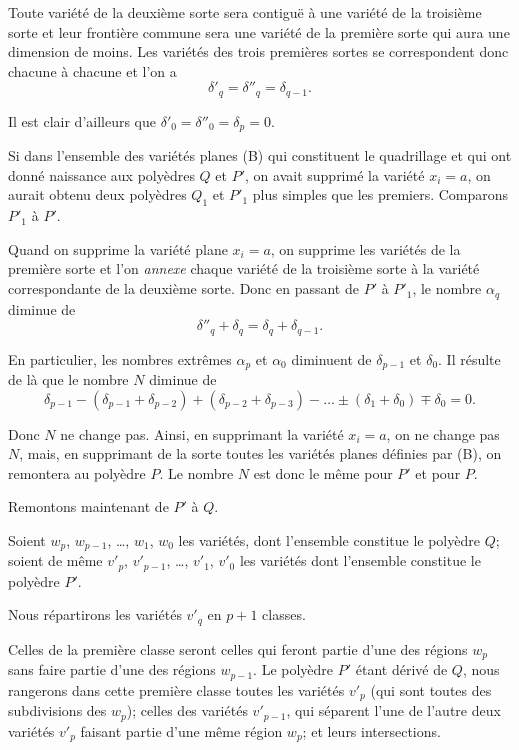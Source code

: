 \documentclass{article}
\begin{document}
Toute variété de la deuxième sorte sera contiguë à une variété de la troisième sorte et leur frontière commune sera une variété de la première sorte qui aura une dimension de moins. Les variétés des trois premières sortes se correspondent donc chacune à chacune et l'on a
\[ \delta'_{q} = \delta''_{q} = \delta_{q-1}. \]

Il est clair d'ailleurs que $\delta'_{0} = \delta''_{0} = \delta_{p} = 0$.

Si dans l'ensemble des variétés planes (B) qui constituent le quadrillage et qui ont donné naissance aux polyèdres $Q$ et $P'$, on avait supprimé la variété $x_{i} = a$, on aurait obtenu deux polyèdres $Q_{1}$ et $P'_{1}$ plus simples que les premiers. Comparons $P'_{1}$ à $P'$.

Quand on supprime la variété plane $x_{i} = a$, on supprime les variétés de la première sorte et l'on \emph{annexe} chaque variété de la troisième sorte à la variété correspondante de la deuxième sorte. Donc en passant de $P'$ à $P'_{1}$, le nombre $\alpha_{q}$ diminue de
\[ \delta''_{q} + \delta_{q} = \delta_{q} + \delta_{q-1}. \]

En particulier, les nombres extrêmes $\alpha_{p}$ et $\alpha_{0}$ diminuent de $\delta_{p-1}$ et $\delta_{0}$. Il résulte de là que le nombre $N$ diminue de
\[ \delta_{p-1} - (\delta_{p-1} + \delta_{p-2}) + (\delta_{p-2} + \delta_{p-3}) - \ldots \pm (\delta_{1} + \delta_{0}) \mp \delta_{0} = 0. \]

Donc $N$ ne change pas. Ainsi, en supprimant la variété $x_{i} = a$, on ne change pas $N$, mais, en supprimant de la sorte toutes les variétés planes définies par (B), on remontera au polyèdre $P$. Le nombre $N$ est donc le même pour $P'$ et pour $P$.

Remontons maintenant de $P'$ à $Q$.

Soient $w_{p}$, $w_{p-1}$, \ldots, $w_{1}$, $w_{0}$ les variétés, dont l'ensemble constitue le polyèdre $Q$; soient de même $v'_{p}$, $v'_{p-1}$, \ldots, $v'_{1}$, $v'_{0}$ les variétés dont l'ensemble constitue le polyèdre $P'$.

Nous répartirons les variétés $v'_{q}$ en $p + 1$ classes.

Celles de la première classe seront celles qui feront partie d'une des régions $w_{p}$ sans faire partie d'une des régions $w_{p-1}$. Le polyèdre $P'$ étant dérivé de $Q$, nous rangerons dans cette première classe toutes les variétés $v'_{p}$ (qui sont toutes des subdivisions des $w_{p}$); celles des variétés $v'_{p-1}$, qui séparent l'une de l'autre deux variétés $v'_{p}$ faisant partie d'une même région $w_{p}$; et leurs intersections.
\end{document}
